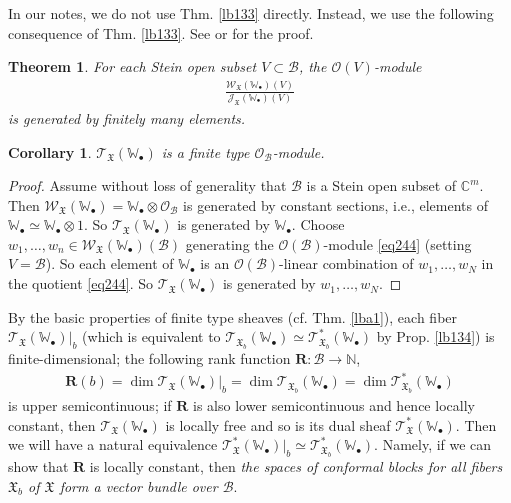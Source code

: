 \documentclass[12pt,a4paper,notitlepage]{article}
\theoremstyle{definition}
\theoremstyle{plain}
\newtheorem{thm}[df]{Theorem}
\newtheorem{co}[df]{Corollary}
\newcommand{\fk}{\mathfrak}
\newcommand{\mc}{\mathcal}
\newcommand{\scr}{\mathscr}
\newcommand{\blt}{\bullet}
\newcommand{\Wbb}{\mathbb W}
\newcommand{\Cbb}{\mathbb C}
\newcommand{\Nbb}{\mathbb N}
\newcommand{\Rbf}{\mathbf R}
\numberwithin{equation}{section}
\begin{document}
In our notes, we do not use Thm. \ref{lb133} directly. Instead, we use the following consequence of Thm. \ref{lb133}. See \cite[Sec. 7]{Gui20} or \cite[Sec. 3.7]{Gui} for the proof.

\begin{thm}\label{lb138}
For each Stein open subset $V\subset\mc B$, the $\scr O(V)$-module
\begin{align}
\frac{\scr W_{\fk X}(\Wbb_\blt)(V)}{\scr J_{\fk X}(\Wbb_\blt)(V)}\label{eq244}
\end{align}
is generated by finitely many elements.
\end{thm}

\begin{co}
$\scr T_{\fk X}(\Wbb_\blt)$ is a finite type $\scr O_{\mc B}$-module.
\end{co}

\begin{proof}
Assume without loss of generality that $\mc B$ is a Stein open subset of $\Cbb^m$. Then $\scr W_{\fk X}(\Wbb_\blt)=\Wbb_\blt\otimes\scr O_{\mc B}$ is generated by constant sections, i.e., elements of $\Wbb_\blt\simeq\Wbb_\blt\otimes 1$. So $\scr T_{\fk X}(\Wbb_\blt)$ is generated by $\Wbb_\blt$. Choose $w_1,\dots,w_n\in \scr W_{\fk X}(\Wbb_\blt)(\mc B)$ generating the $\scr O({\mc B})$-module \eqref{eq244} (setting $V=\mc B$). So each element of $\Wbb_\blt$ is an $\scr O(\mc B)$-linear combination of $w_1,\dots,w_N$ in the quotient \eqref{eq244}. So $\scr T_{\fk X}(\Wbb_\blt)$ is generated by $w_1,\dots,w_N$.
\end{proof}


By the basic properties of finite type sheaves (cf. Thm. \ref{lba1}), each fiber $\scr T_{\fk X}(\Wbb_\blt)|_b$ (which is equivalent to $\scr T_{\fk X_b}(\Wbb_\blt)\simeq\scr T_{\fk X_b}^*(\Wbb_\blt)$ by Prop. \ref{lb134}) is finite-dimensional; the following rank function $\Rbf:\mc B\rightarrow\Nbb$,
\begin{align}
\Rbf(b)=\dim \scr T_{\fk X}(\Wbb_\blt)|_b=\dim\scr T_{\fk X_b}(\Wbb_\blt)=\dim\scr T_{\fk X_b}^*(\Wbb_\blt) \label{eq246}
\end{align}
is upper semicontinuous; if $\Rbf$ is also lower semicontinuous and hence locally constant, then $\scr T_{\fk X}(\Wbb_\blt)$ is locally free and so is its dual sheaf $\scr T_{\fk X}^*(\Wbb_\blt)$. Then we will have a natural equivalence $\scr T_{\fk X}^*(\Wbb_\blt)|_b\simeq\scr T_{\fk X_b}^*(\Wbb_\blt)$. Namely, if we can show that $\Rbf$ is locally constant, then \emph{the spaces of conformal blocks for all fibers $\fk X_b$ of $\fk X$ form a vector bundle over $\mc B$}.
\end{document}
